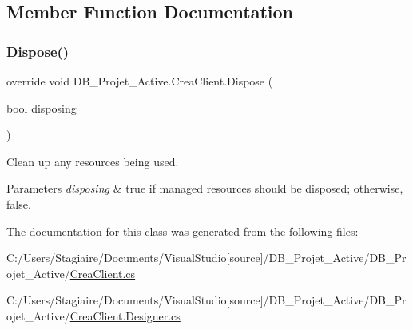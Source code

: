 \subsection{Member Function Documentation}
\mbox{\label{class_d_b___projet___active_1_1_crea_client_a90a6217db2aa0fcb6f38649585ec9193}} 
\subsubsection{\texorpdfstring{Dispose()}{Dispose()}}
{\footnotesize\ttfamily override void D\+B\+\_\+\+Projet\+\_\+\+Active.\+Crea\+Client.\+Dispose (\begin{DoxyParamCaption}\item[{bool}]{disposing }\end{DoxyParamCaption})\hspace{0.3cm}{\ttfamily [protected]}}



Clean up any resources being used. 


\begin{DoxyParams}{Parameters}
{\em disposing} & true if managed resources should be disposed; otherwise, false.\\
\hline
\end{DoxyParams}


The documentation for this class was generated from the following files\+:\begin{DoxyCompactItemize}
\item 
C\+:/\+Users/\+Stagiaire/\+Documents/\+Visual\+Studio\mbox{[}source\mbox{]}/\+D\+B\+\_\+\+Projet\+\_\+\+Active/\+D\+B\+\_\+\+Projet\+\_\+\+Active/\mbox{\hyperlink{_crea_client_8cs}{Crea\+Client.\+cs}}\item 
C\+:/\+Users/\+Stagiaire/\+Documents/\+Visual\+Studio\mbox{[}source\mbox{]}/\+D\+B\+\_\+\+Projet\+\_\+\+Active/\+D\+B\+\_\+\+Projet\+\_\+\+Active/\mbox{\hyperlink{_crea_client_8_designer_8cs}{Crea\+Client.\+Designer.\+cs}}\end{DoxyCompactItemize}

